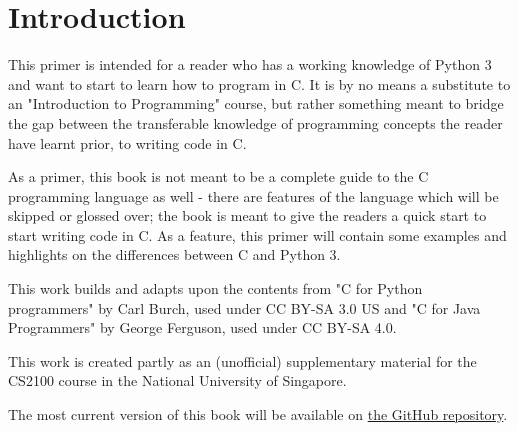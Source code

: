 \chapter{Introduction}
This primer is intended for a reader who has a working knowledge of Python 3 and want to start to learn how to program in C. It is by no means a substitute to an "Introduction to Programming" course, but rather something meant to bridge the gap between the transferable knowledge of programming concepts the reader have learnt prior, to writing code in C. 

As a primer, this book is not meant to be a complete guide to the C programming language as well - there are features of the language which will be skipped or glossed over; the book is meant to give the readers a quick start to start writing code in C. As a feature, this primer will contain some examples and highlights on the differences between C and Python 3.

This work builds and adapts upon the contents from "C for Python programmers" by Carl Burch, used under CC BY-SA 3.0 US and "C for Java Programmers" by George Ferguson, used under CC BY-SA 4.0.

This work is created partly as an (unofficial) supplementary material for the CS2100 course in the National University of Singapore.

The most current version of this book will be available on \href{https://github.com/theodoreleebrant/c_primer}{the GitHub repository}.


